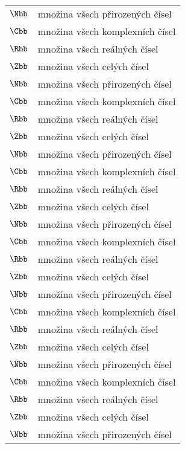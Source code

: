 \begin{flushleft}
\begin{longtable}[l]{ll}
  $\Nbb$                 & množina všech přirozených čísel\\[1mm]
  $\Cbb$                 & množina všech komplexních čísel \\[1mm]
  $\Rbb$                 & množina všech reálných čísel \\[1mm]
  $\Zbb$                 & množina všech celých čísel \\[1mm]
  $\Nbb$                 & množina všech přirozených čísel\\[1mm]  
  $\Cbb$                 & množina všech komplexních čísel \\[1mm]
  $\Rbb$                 & množina všech reálných čísel \\[1mm]
  $\Zbb$                 & množina všech celých čísel \\[1mm]
  $\Nbb$                 & množina všech přirozených čísel\\[1mm]
  $\Cbb$                 & množina všech komplexních čísel \\[1mm]
  $\Rbb$                 & množina všech reálných čísel \\[1mm]
  $\Zbb$                 & množina všech celých čísel \\[1mm]
  $\Nbb$                 & množina všech přirozených čísel\\[1mm]
  $\Cbb$                 & množina všech komplexních čísel \\[1mm]
  $\Rbb$                 & množina všech reálných čísel \\[1mm]
  $\Zbb$                 & množina všech celých čísel \\[1mm]
  $\Nbb$                 & množina všech přirozených čísel\\[1mm]
  $\Cbb$                 & množina všech komplexních čísel \\[1mm]
  $\Rbb$                 & množina všech reálných čísel \\[1mm]
  $\Zbb$                 & množina všech celých čísel \\[1mm]
  $\Nbb$                 & množina všech přirozených čísel\\[1mm]
  $\Cbb$                 & množina všech komplexních čísel \\[1mm]
  $\Rbb$                 & množina všech reálných čísel \\[1mm]
  $\Zbb$                 & množina všech celých čísel \\[1mm]
  $\Nbb$                 & množina všech přirozených čísel\\[1mm]

\end{longtable}
\end{flushleft}
